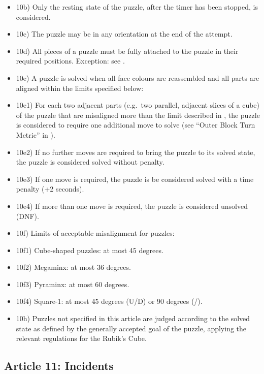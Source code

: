 \begin{itemize}
\item
  10b) Only the resting state of the puzzle, after the timer has been
  stopped, is considered.
\item
  10c) The puzzle may be in any orientation at the end of the attempt.
\item
  10d) All pieces of a puzzle must be fully attached to the puzzle in
  their required positions. Exception: see .
\item
  10e) A puzzle is solved when all face colours are reassembled and all
  parts are aligned within the limits specified below:
\item
  10e1) For each two adjacent parts (e.g.~two parallel, adjacent slices
  of a cube) of the puzzle that are misaligned more than the limit
  described in , the puzzle is considered to require one additional move
  to solve (see ``Outer Block Turn Metric'' in ).
\item
  10e2) If no further moves are required to bring the puzzle to its
  solved state, the puzzle is considered solved without penalty.
\item
  10e3) If one move is required, the puzzle is be considered solved with
  a time penalty (+2 seconds).
\item
  10e4) If more than one move is required, the puzzle is considered
  unsolved (DNF).
\item
  10f) Limits of acceptable misalignment for puzzles:
\item
  10f1) Cube-shaped puzzles: at most 45 degrees.
\item
  10f2) Megaminx: at most 36 degrees.
\item
  10f3) Pyraminx: at most 60 degrees.
\item
  10f4) Square-1: at most 45 degrees (U/D) or 90 degrees (/).
\item
  10h) Puzzles not specified in this article are judged according to the
  solved state as defined by the generally accepted goal of the puzzle,
  applying the relevant regulations for the Rubik's Cube.
\end{itemize}

\subsection{ Article 11: Incidents}

